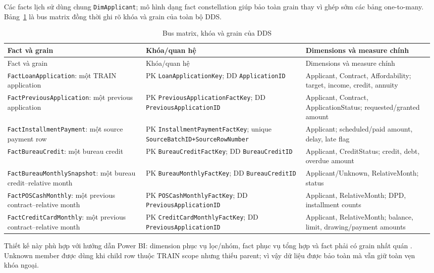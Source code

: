 \documentclass[12pt,a4paper,oneside]{report}
\begin{document}
Các facts lịch sử dùng chung \texttt{DimApplicant}; mô hình dạng fact constellation giúp bảo toàn grain thay vì ghép sớm các bảng one-to-many. Bảng~\ref{tab:dds-bus} là bus matrix đồng thời ghi rõ khóa và grain của toàn bộ DDS.

\begin{longtable}{p{3.7cm}p{4.7cm}p{6.0cm}}
\caption{Bus matrix, khóa và grain của DDS}\label{tab:dds-bus}\\
\toprule
Fact và grain & Khóa/quan hệ & Dimensions và measure chính \\
\midrule
\endfirsthead
\toprule Fact và grain & Khóa/quan hệ & Dimensions và measure chính \\
\midrule
\endhead
\texttt{FactLoanApplication}: một TRAIN application & PK \texttt{LoanApplicationKey}; DD \texttt{ApplicationID} & Applicant, Contract, Affordability; target, income, credit, annuity \\
\texttt{FactPreviousApplication}: một previous application & PK \texttt{PreviousApplicationFactKey}; DD \texttt{PreviousApplicationID} & Applicant, Contract, ApplicationStatus; requested/granted amount \\
\texttt{FactInstallmentPayment}: một source payment row & PK \texttt{InstallmentPaymentFactKey}; unique \texttt{SourceBatchID+SourceRowNumber} & Applicant; scheduled/paid amount, delay, late flag \\
\texttt{FactBureauCredit}: một bureau credit & PK \texttt{BureauCreditFactKey}; DD \texttt{BureauCreditID} & Applicant, CreditStatus; credit, debt, overdue amount \\
\texttt{FactBureauMonthlySnapshot}: một bureau credit--relative month & PK \texttt{BureauMonthlyFactKey}; DD \texttt{BureauCreditID} & Applicant/Unknown, RelativeMonth; status \\
\texttt{FactPOSCashMonthly}: một previous contract--relative month & PK \texttt{POSCashMonthlyFactKey}; DD \texttt{PreviousApplicationID} & Applicant, RelativeMonth; DPD, installment counts \\
\texttt{FactCreditCardMonthly}: một previous contract--relative month & PK \texttt{CreditCardMonthlyFactKey}; DD \texttt{PreviousApplicationID} & Applicant, RelativeMonth; balance, limit, drawing/payment amounts \\
\bottomrule
\end{longtable}

Thiết kế này phù hợp với hướng dẫn Power BI: dimension phục vụ lọc/nhóm, fact phục vụ tổng hợp và fact phải có grain nhất quán \cite{powerbistar}. Unknown member được dùng khi child row thuộc TRAIN scope nhưng thiếu parent; vì vậy dữ liệu được bảo toàn mà vẫn giữ toàn vẹn khóa ngoại.
\end{document}
